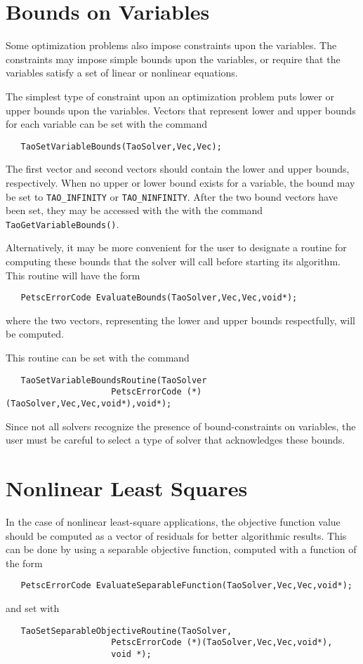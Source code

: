 \section{Bounds on Variables}\label{sec:bounds}

Some optimization problems also impose constraints upon the variables.
The constraints may impose simple bounds upon the variables, or
require that the variables satisfy a set of linear or  nonlinear equations.

The simplest type of constraint upon an optimization problem puts lower
or upper bounds upon the variables. 
Vectors that represent lower and upper bounds for each variable 
can be set with the command  
\begin{verbatim}
   TaoSetVariableBounds(TaoSolver,Vec,Vec);
\end{verbatim}
\noindent
The first vector and second vectors should contain the lower and upper 
bounds, respectively.
When no upper or lower bound exists for a variable, the bound
may be set to {\tt TAO\_INFINITY} or {\tt TAO\_NINFINITY}.
After the two bound vectors have been set, they may be accessed with the
with the command  {\tt TaoGetVariableBounds()}.

Alternatively, it may be more convenient for the user to designate a routine 
for computing these bounds
that the solver will call before starting its algorithm.  This routine will
have the form
\begin{verbatim}
   PetscErrorCode EvaluateBounds(TaoSolver,Vec,Vec,void*);
\end{verbatim}
where the two vectors, representing the lower and upper bounds respectfully, 
will be computed.

This routine can be set with the command
\begin{verbatim}
   TaoSetVariableBoundsRoutine(TaoSolver
                     PetscErrorCode (*)(TaoSolver,Vec,Vec,void*),void*);
\end{verbatim}
   
Since not all solvers recognize the presence of bound-constraints on 
variables, the user must be careful 
to select a type of solver that acknowledges these bounds.

\section{Nonlinear Least Squares}\label{sec:evalsof}
In the case of nonlinear least-square applications, the objective function
value should be computed as a vector of residuals for better algorithmic 
results.  This can be done by using a separable objective function, computed
with a function of the form
\begin{verbatim}
   PetscErrorCode EvaluateSeparableFunction(TaoSolver,Vec,Vec,void*);
\end{verbatim}
and set with
\begin{verbatim}
   TaoSetSeparableObjectiveRoutine(TaoSolver,
                     PetscErrorCode (*)(TaoSolver,Vec,Vec,void*),
                     void *);
\end{verbatim}

